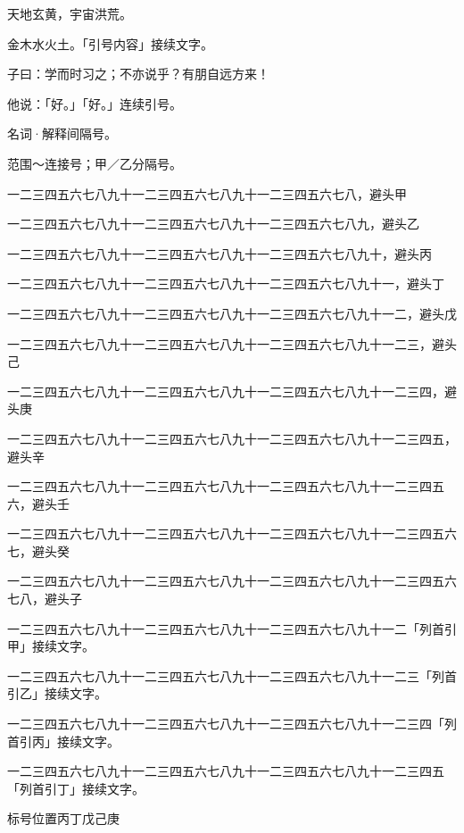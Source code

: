 \documentclass{ltc-cn-vbook}
\begin{document}
\begin{正文}
天地玄黄，宇宙洪荒。

金木水火土。「引号内容」接续文字。

子曰：学而时习之；不亦说乎？有朋自远方来！

他说：「好。」「好。」连续引号。

名词·解释间隔号。

范围～连接号；甲／乙分隔号。

一二三四五六七八九十一二三四五六七八九十一二三四五六七八，避头甲

一二三四五六七八九十一二三四五六七八九十一二三四五六七八九，避头乙

一二三四五六七八九十一二三四五六七八九十一二三四五六七八九十，避头丙

一二三四五六七八九十一二三四五六七八九十一二三四五六七八九十一，避头丁

一二三四五六七八九十一二三四五六七八九十一二三四五六七八九十一二，避头戊

一二三四五六七八九十一二三四五六七八九十一二三四五六七八九十一二三，避头己

一二三四五六七八九十一二三四五六七八九十一二三四五六七八九十一二三四，避头庚

一二三四五六七八九十一二三四五六七八九十一二三四五六七八九十一二三四五，避头辛

一二三四五六七八九十一二三四五六七八九十一二三四五六七八九十一二三四五六，避头壬

一二三四五六七八九十一二三四五六七八九十一二三四五六七八九十一二三四五六七，避头癸

一二三四五六七八九十一二三四五六七八九十一二三四五六七八九十一二三四五六七八，避头子

一二三四五六七八九十一二三四五六七八九十一二三四五六七八九十一二「列首引甲」接续文字。

一二三四五六七八九十一二三四五六七八九十一二三四五六七八九十一二三「列首引乙」接续文字。

一二三四五六七八九十一二三四五六七八九十一二三四五六七八九十一二三四「列首引丙」接续文字。

一二三四五六七八九十一二三四五六七八九十一二三四五六七八九十一二三四五「列首引丁」接续文字。

标号位置丙丁戊己庚

\end{正文}
\end{document}
